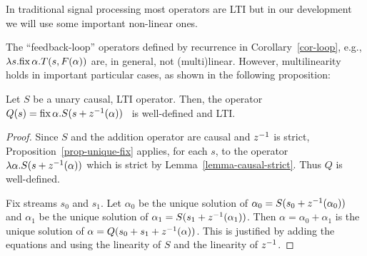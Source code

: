 In traditional signal processing most operators are LTI but in our development
we will use some important non-linear ones. 

The ``feedback-loop'' operators defined by recurrence in Corollary~\ref{cor-loop},
e.g., $\lambda s.\mbox{fix}\,\alpha.T(s,F(\alpha))$ are, in general, not (multi)linear.
However, multilinearity holds in important particular cases,
as shown in the following proposition:

\begin{proposition}
\label{prop-rec-linear}
Let $S$ be a unary causal, LTI operator. Then, the
operator $Q(s)=\mbox{fix}\,\alpha.S(s+z^{-1}(\alpha))$~ is well-defined and LTI.
\end{proposition}

\begin{center}
\end{center}

\begin{proof} Since $S$ and the addition operator
are causal and $z^{-1}$ is strict, Proposition~\ref{prop-unique-fix} applies, 
for each $s$, to the operator
$\lambda\alpha.S(s+z^{-1}(\alpha))$ which is strict by Lemma~\ref{lemma-causal-strict}.
Thus $Q$ is well-defined.

Fix streams $s_0$ and $s_1$. Let $\alpha_0$
be the unique solution of $\alpha_0=S(s_0+z^{-1}(\alpha_0))$ and 
$\alpha_1$ be the unique solution of $\alpha_1=S(s_1+z^{-1}(\alpha_1))$.
Then $\alpha=\alpha_0+\alpha_1$ is the unique solution of 
$\alpha=Q(s_0+s_1+z^{-1}(\alpha))$. This is justified by adding the equations
and using the linearity of $S$ and the linearity of $z^{-1}$.
\end{proof}

